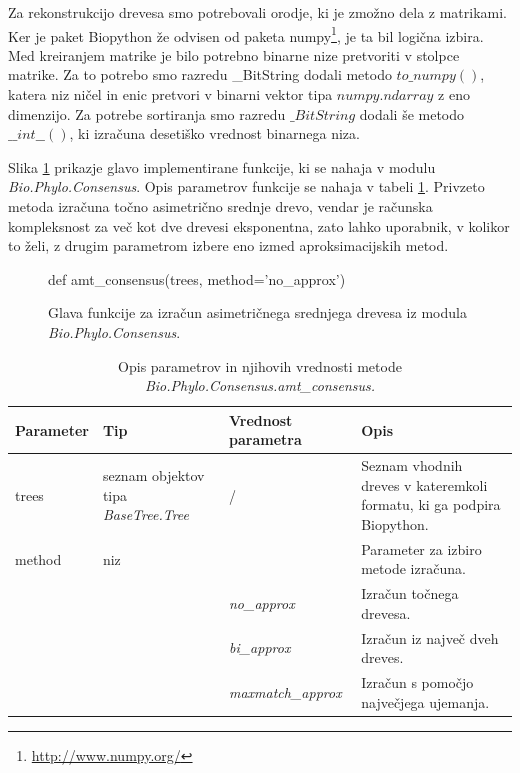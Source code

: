 \documentclass[a4paper, 12pt]{book}
\begin{document}
Za rekonstrukcijo drevesa smo potrebovali orodje, ki je zmožno dela z matrikami. Ker je paket Biopython že odvisen od paketa numpy\footnote{\url{http://www.numpy.org/}}, je ta bil logična izbira. Med kreiranjem matrike je bilo potrebno binarne nize pretvoriti v stolpce matrike. Za to potrebo smo razredu \_BitString dodali metodo $to\_numpy()$, katera niz ničel in enic pretvori v binarni vektor tipa $numpy.ndarray$ z eno dimenzijo. Za potrebe sortiranja smo razredu $\_BitString$ dodali še metodo $\_\_int\_\_()$, ki izračuna desetiško vrednost binarnega niza.

Slika \ref{code-amt-func} prikazje glavo implementirane funkcije, ki se nahaja v modulu {\it Bio.Phylo.Consensus}. Opis parametrov funkcije se nahaja v tabeli \ref{table-amt-head}. Privzeto metoda izračuna točno asimetrično srednje drevo, vendar je računska kompleksnost za več kot dve drevesi eksponentna, zato lahko uporabnik, v kolikor to želi, z drugim parametrom izbere eno izmed aproksimacijskih metod. 

\begin{figure}[h!]
	\begin{python}
		def amt_consensus(trees, method='no_approx')
	\end{python}
	\caption{Glava funkcije za izračun asimetričnega srednjega drevesa iz modula {\it Bio.Phylo.Consensus}.}
	\label{code-amt-func}
\end{figure}

\begin{table}
	\begin{center}
	{\footnotesize
    \begin{tabular}{ >{\centering}m{1.7cm} | >{\centering}m{2.9cm} | >{\centering}m{2.6cm} | >{\centering}m{4cm} } 
    Parameter & Tip                             & Vrednost parametra                        & Opis   \tabularnewline
    \hline
    trees     & seznam objektov tipa {\it BaseTree.Tree}           & /                      & Seznam vhodnih dreves v kateremkoli formatu, ki ga podpira Biopython.  \tabularnewline
    \hline
    \hline
    method    & niz                             &  ~                                        & Parameter za izbiro metode izračuna.  \tabularnewline
    ~         & ~                               & {\it no\_approx}                          & Izračun točnega drevesa.  \tabularnewline
    ~         & ~                               & {\it bi\_approx}                          & Izračun iz največ dveh dreves.  \tabularnewline
    ~         & ~                               & {\it maxmatch\_approx}                    & Izračun s pomočjo največjega ujemanja.  \tabularnewline
    \hline
    \end{tabular}
    }
    \caption{Opis parametrov in njihovih vrednosti metode {\it Bio.Phylo.Consensus.amt\_consensus.}}
    \label{table-amt-head}
	\end{center}    
\end{table}
\end{document}

